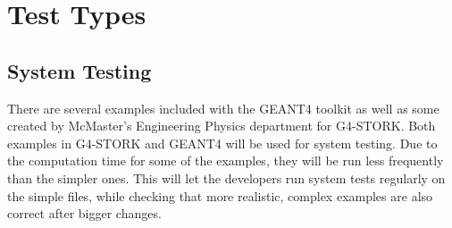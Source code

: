 \documentclass[12pt]{article}
\begin{document}
\section{Test Types}

\subsection{System Testing} %
There are several examples included with the GEANT4 toolkit as well as some created by McMaster's Engineering Physics department for G4-STORK. Both examples in G4-STORK and GEANT4 will be used for system testing. Due to the computation time for some of the examples, they will be run less frequently than the simpler ones. This will let the developers run system tests regularly on the simple files, while checking that more realistic, complex examples are also correct after bigger changes.
\newpage
\end{document}
